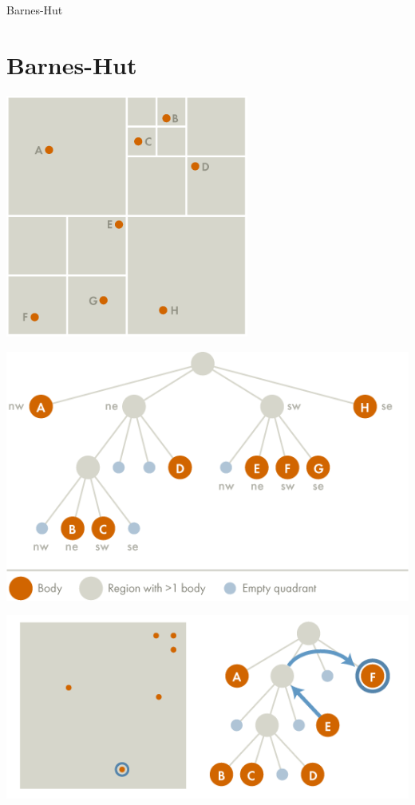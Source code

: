 \documentclass{beamer}
\begin{document}
\begin{frame}[allowframebreaks]{Barnes-Hut}
\section{Barnes-Hut}

\includegraphics[width=0.6\textwidth]{quadtree}

\framebreak

\includegraphics[width=\textwidth]{quadtree_tree}

\framebreak

\includegraphics[width=\textwidth]{quadtree_leaf}


\end{frame}
\end{document}
